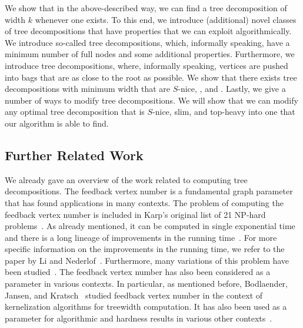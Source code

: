 \documentclass[a4paper,UKenglish,cleveref, autoref, thm-restate, numberwithinsect]{lipics-v2021}
\newcounter{algorithm}
\newcommand{\slim}{\text{slim}\xspace}
\newcommand{\topheavy}{\text{top-heavy}\xspace}
\begin{document}
We show that in the above-described way, we can find a tree decomposition of width $k$ whenever one exists.
To this end, we introduce (additional) novel classes of tree decompositions that have properties that we can exploit algorithmically. We introduce so-called \emph{\slim} tree decompositions, which, informally speaking, have a minimum number of full nodes and some additional properties. Furthermore, we introduce \emph{\topheavy} tree decompositions, where, informally speaking, vertices are pushed into bags that are as close to the root as possible. We show that there exists tree decompositions with minimum width that are $S$-nice, \slim, and \topheavy.
Lastly, we give a number of ways to modify tree decompositions. We will show that we can modify any optimal tree decomposition that is $S$-nice, slim, and top-heavy into one that our algorithm is able to find.

\subsection{Further Related Work} We already gave an overview of the work related to computing tree decompositions. 
The feedback vertex number is a fundamental graph parameter that has found applications in many contexts. The problem of computing the feedback vertex number is included in Karp's original list of 21 NP-hard problems~\cite{Kar72}. As already mentioned, it can be computed in single exponential time and there is a long lineage of improvements in the running time~\cite{becker2000randomized,guo2006compression,kociumaka2014faster,li2022detecting}. For more specific information on the improvements in the running time, we refer to the paper by Li and Nederlof~\cite{li2022detecting}. Furthermore, many variations of this problem have been studied~\cite{agrawal2018simultaneous,casteigts2021finding,chaudhary2025parameterized,cygan2013subset,kanesh2021parameterized,LokshtanovRS18,misra2012parameterized,misra2012fpt}.
The feedback vertex number has also been considered as a parameter in various contexts. In particular, as mentioned before, Bodlaender, Jansen, and Kratsch~\cite{bodlaender2013preprocessing} studied feedback vertex number in the context of kernelization algorithms for treewidth computation. It has also been used as a parameter for algorithmic and hardness results in various other contexts~\cite{AdigaCS10,casteigts2021finding,EnrightMM23,jansen2013vertex,KratschS10,zehavi2023tournament}.
\end{document}
